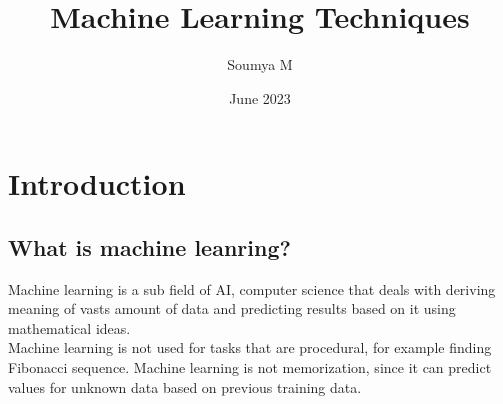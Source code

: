 \documentclass[12pt,a4paper]{article}
\title{Machine Learning Techniques}
\author{Soumya M}
\date{June 2023}
\begin{document}
\maketitle

\tableofcontents
\newpage

\section{Introduction}
\subsection{What is machine leanring?}
Machine learning is a sub field of AI, computer science that deals with deriving meaning of vasts amount of data and predicting results based on it using mathematical ideas.\\
Machine learning is not used for tasks that are procedural, for example finding Fibonacci sequence. Machine learning is not memorization, since it can predict values for unknown data based on previous training data. 
\end{document}

